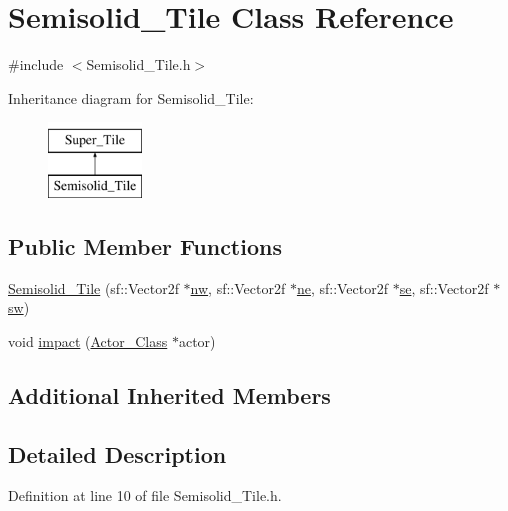 \hypertarget{class_semisolid___tile}{}\section{Semisolid\+\_\+\+Tile Class Reference}
\label{class_semisolid___tile}


{\ttfamily \#include $<$Semisolid\+\_\+\+Tile.\+h$>$}

Inheritance diagram for Semisolid\+\_\+\+Tile\+:\begin{figure}[H]
\begin{center}
\leavevmode
\includegraphics[height=2.000000cm]{class_semisolid___tile}
\end{center}
\end{figure}
\subsection*{Public Member Functions}
\begin{DoxyCompactItemize}
\item 
\hyperlink{class_semisolid___tile_a1fad2979b1c9d34e4311339f91e68149}{Semisolid\+\_\+\+Tile} (sf\+::\+Vector2f $\ast$\hyperlink{class_super___tile_ad6bcea1fd54f67808f54ba2aacd88596}{nw}, sf\+::\+Vector2f $\ast$\hyperlink{class_super___tile_a55f6d2860da36f13019bd4e0d18364ca}{ne}, sf\+::\+Vector2f $\ast$\hyperlink{class_super___tile_ab384b89a7a631b8b75c4d405c51a23e1}{se}, sf\+::\+Vector2f $\ast$\hyperlink{class_super___tile_abe9efe0c3d1ed440395225843435dfc8}{sw})
\item 
void \hyperlink{class_semisolid___tile_a65c8e43f414282be042b81c62fc63431}{impact} (\hyperlink{class_actor___class}{Actor\+\_\+\+Class} $\ast$actor)
\end{DoxyCompactItemize}
\subsection*{Additional Inherited Members}


\subsection{Detailed Description}


Definition at line 10 of file Semisolid\+\_\+\+Tile.\+h.



